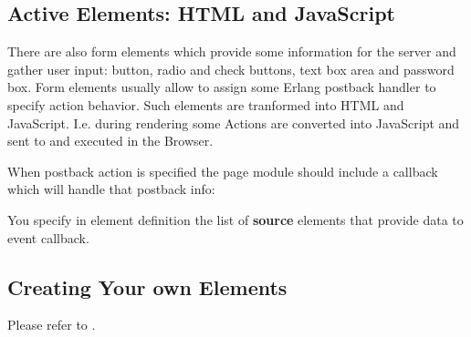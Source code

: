 \documentclass[11pt]{article}
\begin{document}

\subsection*{Active Elements: HTML and JavaScript}
There are also form elements which provide some information for the server
and gather user input:  button, radio and check buttons, text box area and password box.
Form elements usually allow to assign some Erlang postback handler to specify action behavior.
Such elements are tranformed into HTML and JavaScript. I.e. during rendering some
Actions are converted into JavaScript and sent to and executed in the Browser.


When postback action is specified the page module should include a callback which will handle that postback info:


You specify in element definition the list of {\bf source} elements that provide data to event callback.

\subsection*{Creating Your own Elements}
Please refer to .







\end{document}
